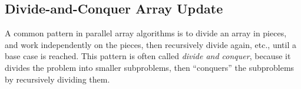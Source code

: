 \begin{comment}
\subsubsection{Algorithm Example:  International Data Encryption Algorithm (IDEA)%
\label{sec:array:blocked:idea}}

Now we show how the Blocked Array Update pattern can be used to
parallelize the International Data Encryption Algorithm (IDEA).  IDEA
is a block cipher code that was designed as a replacement for the Data
Encryption Standard (DES).  It operates on 64 bit blocks using a 128
bit key using a series of eight transformations.  We use Blocked Array
Update because the algorithm requires that the blocking structure be
explicit in the code, and not hidden in the runtime.

TODO: EXPLAIN FIGURE

\begin{figure}
\begin{numbereddpjlisting}
// slice has the number of blocks.
  DPJPartitionByte<R1> inSegs  = DPJPartitionByte.stridedPartition(plain1, slice);
  DPJPartitionByte<R2> outSegs = DPJPartitionByte.stridedPartition(crypt1, slice);
  foreach (int i in 0, inSegs.length)
  {
    DPJArrayByte<inSegs:[i]:*>inSeg = inSegs.get(i);
    DPJArrayByte<outSegs:[i]:*>outSeg = outSegs.get(i);
    run1(0, inSeg.length, inSeg, outSeg, Z); // do the encryption
  }

\end{numbereddpjlisting}
\caption{Blocked Array Update in IDEA.}
\label{fig:array:idea}
\end{figure}
\end{comment}

\subsection{Divide-and-Conquer Array Update%
\label{sec:array:dandc}}

A common pattern in parallel array algorithms is to divide an array in
pieces, and work independently on the pieces, then recursively divide
again, etc., until a base case is reached.  This pattern is often
called \emph{divide and conquer}, because it divides the problem into
smaller subproblems, then ``conquers'' the subproblems by recursively
dividing them.


